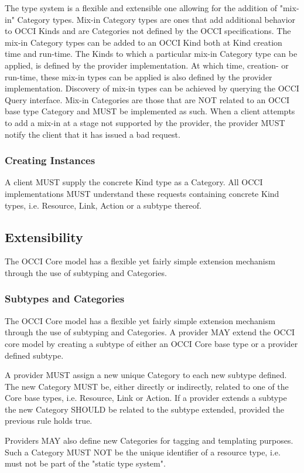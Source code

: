 \documentclass[10pt,a4paper]{article}
\begin{document}
The type system is a flexible and extensible one allowing for the addition of "mix-in" Category types. Mix-in Category types are ones that add additional behavior to OCCI Kinds and are Categories not defined by the OCCI specifications. The mix-in Category types can be added to an OCCI Kind both at Kind creation time and run-time. The Kinds to which a particular mix-in Category type can be applied, is defined by the provider implementation. At which time, creation- or run-time, these mix-in types can be applied is also defined by the provider implementation. Discovery of mix-in types can be achieved by querying the OCCI Query interface. Mix-in Categories are those that are NOT related to an OCCI base type Category and MUST be implemented as such. When a client attempts to add a mix-in at a stage not supported by the provider, the provider MUST notify the client that it has issued a bad request.

\subsubsection{Creating Instances}
A client MUST supply the concrete Kind type as a Category. All OCCI implementations MUST understand these requests containing concrete Kind types, i.e. Resource, Link, Action or a subtype thereof.

\subsection{Extensibility}
The OCCI Core model has a flexible yet fairly simple extension mechanism through the use of subtyping and Categories. 

\subsubsection{Subtypes and Categories}
The OCCI Core model has a flexible yet fairly simple extension mechanism through the use of subtyping and Categories.
A provider MAY extend the OCCI core model by creating a subtype of either an OCCI Core base type or a provider defined subtype.

A provider MUST assign a new unique Category to each new subtype defined. The new Category MUST be, either directly or indirectly, related to one of the Core base types, i.e. Resource, Link or Action. If a provider extends a subtype the new Category SHOULD be related to the subtype extended, provided the previous rule holds true.

Providers MAY also define new Categories for tagging and templating purposes. Such a Category MUST NOT be the unique identifier of a resource type, i.e. must not be part of the "static type system".
\end{document}
